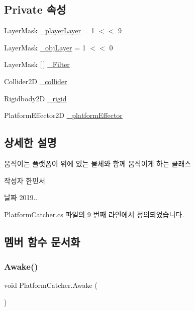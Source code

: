 \subsection*{Private 속성}
\begin{DoxyCompactItemize}
\item 
Layer\+Mask \mbox{\hyperlink{class_platform_catcher_ab82e88a61495d5965d1d8cc14e62a91e}{\+\_\+player\+Layer}} = 1 $<$$<$ 9
\item 
Layer\+Mask \mbox{\hyperlink{class_platform_catcher_a59c46f8bc8af74dcf892f8b87b36fff1}{\+\_\+obj\+Layer}} = 1 $<$$<$ 0
\item 
Layer\+Mask \mbox{[}$\,$\mbox{]} \mbox{\hyperlink{class_platform_catcher_a2e1f324ee414bf1f423d9ae7c61ed5c2}{\+\_\+\+Filter}}
\item 
Collider2D \mbox{\hyperlink{class_platform_catcher_aa301b8dfc4e4d2248eeee749691a85a6}{\+\_\+collider}}
\item 
Rigidbody2D \mbox{\hyperlink{class_platform_catcher_ae8627f8ac9558d21ee7b73eb5bb7d202}{\+\_\+rigid}}
\item 
Platform\+Effector2D \mbox{\hyperlink{class_platform_catcher_a9a76fa21f5f0843c1115e36e50eb33f6}{\+\_\+platform\+Effector}}
\end{DoxyCompactItemize}


\subsection{상세한 설명}
움직이는 플랫폼이 위에 있는 물체와 함께 움직이게 하는 클래스 

\begin{DoxyAuthor}{작성자}
한민서 
\end{DoxyAuthor}
\begin{DoxyDate}{날짜}
2019.. 
\end{DoxyDate}


Platform\+Catcher.\+cs 파일의 9 번째 라인에서 정의되었습니다.



\subsection{멤버 함수 문서화}
\mbox{\label{class_platform_catcher_a85b586a2617a568e4201c3f3b3c4103f}} 
\subsubsection{\texorpdfstring{Awake()}{Awake()}}
{\footnotesize\ttfamily void Platform\+Catcher.\+Awake (\begin{DoxyParamCaption}{ }\end{DoxyParamCaption})\hspace{0.3cm}{\ttfamily [private]}}



